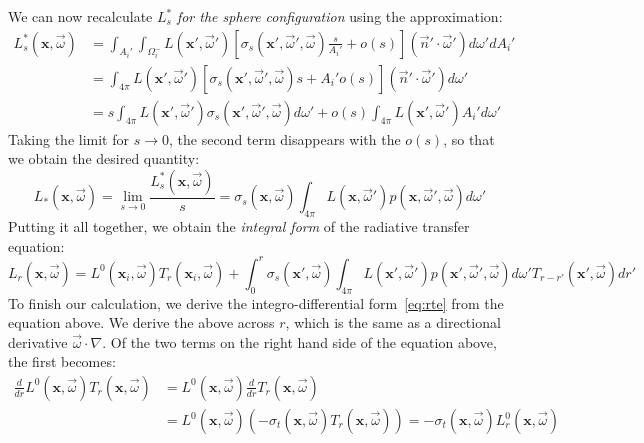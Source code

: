 We can now recalculate $L_s^*$ \emph{for the sphere configuration} using the approximation:
\begin{equation}
\begin{split}
L_s^*(\mathbf{x}, \vec{\omega}) &= \int_{A_i'} \int_{\Omega^-_i} L(\mathbf{x}', \vec{\omega}')  [\sigma_s(\mathbf{x}', \vec{\omega}', \vec{\omega}) \frac{s}{A_i'} + o(s)] (\vec{n}' \cdot \vec{\omega}') d\omega' dA_i'  \\
&= \int_{4\pi}  L(\mathbf{x}', \vec{\omega}')  [\sigma_s(\mathbf{x}', \vec{\omega}', \vec{\omega}) s + A_i' o(s)] (\vec{n}' \cdot \vec{\omega}') d\omega'\\
&= s \int_{4\pi}  L(\mathbf{x}', \vec{\omega}')  \sigma_s(\mathbf{x}', \vec{\omega}', \vec{\omega}) d\omega' + o(s) \int_{4\pi}  L(\mathbf{x}', \vec{\omega}') A_i'   d\omega'
\end{split}
\end{equation}
Taking the limit for $s\rightarrow 0$, the second term disappears with the $o(s)$, so that we obtain the desired quantity:
\begin{equation}
\label{eq:lstar}
L_*(\mathbf{x}, \vec{\omega}) = \lim_{s\rightarrow 0} \frac{L_s^*(\mathbf{x}, \vec{\omega})}{s} = \sigma_s(\mathbf{x}, \vec{\omega}) \int_{4\pi} L(\mathbf{x}, \vec{\omega}') p(\mathbf{x}, \vec{\omega}', \vec{\omega})   d\omega' 
\end{equation}
Putting it all together, we obtain the \emph{integral form} of the radiative transfer equation:
\begin{equation*}
L_r(\mathbf{x}, \vec{\omega}) =  L^0(\mathbf{x}_i, \vec{\omega}) T_r(\mathbf{x}_i, \vec{\omega}) + \int_0^r \sigma_s(\mathbf{x}', \vec{\omega}) \int_{4\pi} L(\mathbf{x}', \vec{\omega}') p(\mathbf{x}', \vec{\omega}', \vec{\omega})  d\omega' T_{r-r'}(\mathbf{x}', \vec{\omega})  dr'
\end{equation*}
To finish our calculation, we derive the integro-differential form~\ref{eq:rte} from the equation above. We derive the above across $r$, which is the same as a directional derivative $ \vec{\omega} \cdot \nabla$. Of the two terms on the right hand side of the equation above, the first becomes:
\begin{equation}
\begin{split}
\frac{d}{dr} L^0(\mathbf{x}, \vec{\omega}) T_r(\mathbf{x}, \vec{\omega}) &= L^0(\mathbf{x}, \vec{\omega}) \frac{d}{dr}  T_r(\mathbf{x}, \vec{\omega}) \\
&= L^0(\mathbf{x}, \vec{\omega}) (-\sigma_t(\mathbf{x}, \vec{\omega}) T_r(\mathbf{x}, \vec{\omega})) = -\sigma_t(\mathbf{x}, \vec{\omega}) L_r^0(\mathbf{x}, \vec{\omega})
\end{split}
\end{equation}
